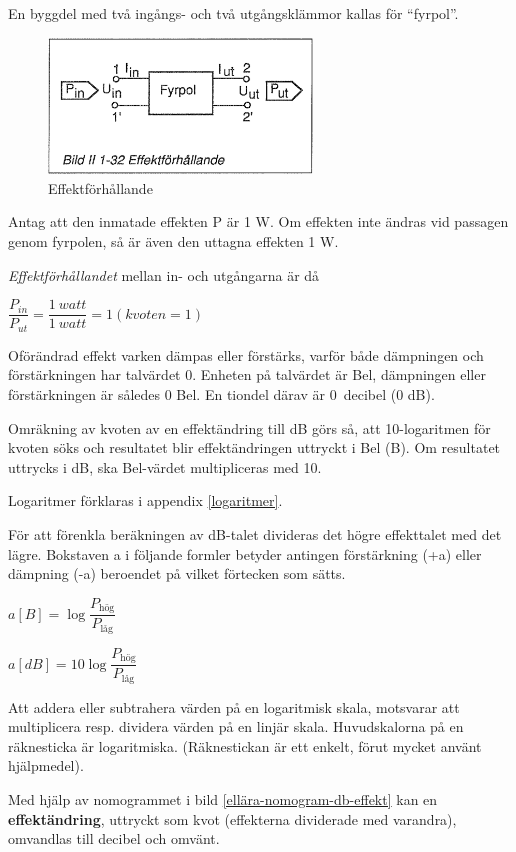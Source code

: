 En byggdel med två ingångs- och två utgångsklämmor kallas för ``fyrpol''.

\begin{figure}[th]
\begin{center}
\includegraphics[width=7cm]{images/bild_2_1-32}
\caption{Effektförhållande}
\label{fig:BildII1-32}
\end{center}
\end{figure}

Antag att den inmatade effekten P är 1 W. Om effekten inte ändras vid passagen
genom fyrpolen, så är även den uttagna effekten 1 W.

\emph{Effektförhållandet} mellan in- och utgångarna är då

\(\dfrac{P_{in}}{P_{ut}} = \dfrac{1\ watt}{1\ watt} = 1 (kvoten = 1)\)

Oförändrad effekt varken dämpas eller förstärks, varför både dämpningen och
förstärkningen har talvärdet 0. Enheten på talvärdet är Bel, dämpningen eller
förstärkningen är således 0 Bel. En tiondel därav är 0~decibel (0 dB).

Omräkning av kvoten av en effektändring till dB görs så, att 10-logaritmen för
kvoten söks och resultatet blir effektändringen uttryckt i Bel (B). Om
resultatet uttrycks i dB, ska Bel-värdet multipliceras med 10.

Logaritmer förklaras i appendix \ref{logaritmer}.

För att förenkla beräkningen av dB-talet divideras det högre effekttalet med det
lägre. Bokstaven a i följande formler betyder antingen förstärkning (+a) eller
dämpning (-a) beroendet på vilket förtecken som sätts.

\(a[B] = \log \dfrac{P_\text{hög}}{P_\text{låg}}\)

\(a[dB] = 10\log \dfrac{P_\text{hög}}{P_\text{låg}}\)

Att addera eller subtrahera värden på en logaritmisk skala, motsvarar att
multiplicera resp. dividera värden på en linjär skala. Huvudskalorna på en
räknesticka är logaritmiska. (Räknestickan är ett enkelt, förut mycket använt
hjälpmedel).

Med hjälp av nomogrammet i bild \ref{ellära-nomogram-db-effekt} kan en \textbf{effektändring}, uttryckt som kvot
(effekterna dividerade med varandra), omvandlas till decibel och omvänt.

